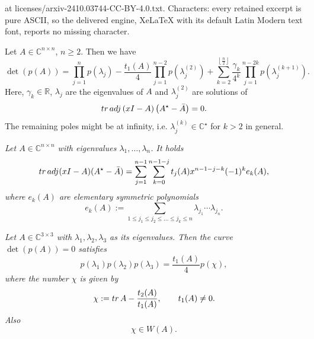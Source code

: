 \documentclass[10pt,a4paper]{amsart}
\newenvironment{corollary}{\begin{dk}\it}{\end{dk}}
\newcommand{\deter}[1]{\det\zav{#1}}
\newenvironment{lemma}{\begin{lm}\it}{\end{lm}}
\newcommand{\tr}{{\rm tr}\,}
\newcommand{\trunc}[1]{\left\lfloor #1 \right\rfloor}
\newcommand{\zav}[1]{\left( #1 \right)}
\begin{document}
at licenses/arxiv-2410.03744-CC-BY-4.0.txt. Characters: every retained excerpt is pure ASCII, so the delivered engine, XeLaTeX with its default Latin Modern text font, reports no missing character.
\begin{theorem}\label{maint}
Let $A\in\mathbb{C}^{n\times n}$, $n\geq 2$. Then we have
\begin{equation}\label{covalpa}
\deter{p(A)}=\prod_{j=1}^{n}p(\lambda_j)-\frac{t_1(A)}{4}\prod_{j=1}^{n-2}p\zav{\lambda^{(2)}_j}+\sum_{k=2}^{\trunc{\frac{n}{2}}}\frac{\gamma_k}{4^k}\prod_{j=1}^{n-2k}p\zav{\lambda^{(k+1)}_{j}}.
\end{equation}
Here, $\gamma_k\in \mathbb{R}$,  $\lambda_j$ are the eigenvalues of $A$ and $\lambda^{(2)}_j$ are solutions of 
\begin{equation}\label{anticharacteristiceq}
\tr {\rm adj}\zav{x I-A}\zav{A^\star-\bar A}=0.
\end{equation}
The remaining poles might be at infinity, i.e. $\lambda_{j}^{(k)}\in \mathbb{C}^\star$ for $k>2$ in general. 
\end{theorem}

\begin{lemma}
Let $A\in\mathbb{C}^{n\times n}$ with eigenvalues $\lambda_1,\dots, \lambda_n$. It holds
\begin{equation}\label{anticharexplicit}
\tr {\rm adj}(xI-A)(A^\star -\bar A)=\sum_{j=1}^{n-1}\sum_{k=0}^{n-1-j}t_j(A)x^{n-1-j-k}(-1)^k e_k(A),
\end{equation}
where $e_k(A)$ are elementary symmetric polynomials
$$
e_k(A):=\sum_{1\leq j_1\leq j_2\leq\dots \leq j_k\leq n }\lambda_{j_1}\cdots \lambda_{j_n}.
$$
\end{lemma}

\begin{corollary}\label{3by3cor}
Let $A\in\mathbb{C}^{3\times 3}$ with $\lambda_1,\lambda_2,\lambda_3$ as its eigenvalues. Then the curve $\deter{p(A)}=0$ satisfies
\begin{equation}\label{covalpa3}
p(\lambda_1)p(\lambda_2)p(\lambda_3)=\frac{t_1(A)}{4}p(\chi),
\end{equation}
where the number $\chi$ is given by 
\begin{equation}\label{lambda2formula}
\chi:=\tr A-\frac{t_2(A)}{t_1(A)},\qquad t_1(A)\not=0.
\end{equation}
Also
\begin{equation}\label{chiinWA}
\chi\in W(A).
\end{equation}
\end{corollary}
\end{document}
